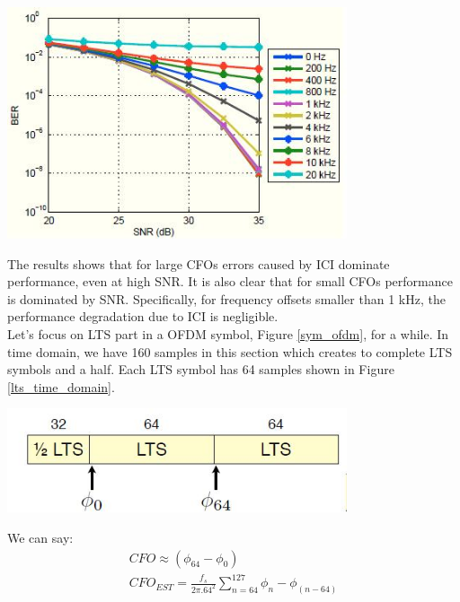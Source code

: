 \begin{center}
\includegraphics[width=10cm]{content/fig/cfo_on_ici.JPG}
\label{cfo_impact_on_ici}
\end{center}

The results shows that for large CFOs errors caused by ICI dominate performance, even at high SNR. It is also
clear that for small CFOs performance is dominated by SNR. Specifically, for frequency offsets smaller than 1 kHz, the
performance degradation due to ICI is negligible.\\
Let's focus on LTS part in a OFDM symbol, Figure \ref{sym_ofdm}, for a while. In time domain, we have 160 samples in this section which creates to complete LTS symbols and a half. Each LTS symbol has 64 samples shown in Figure \ref{lts_time_domain}.\\

\begin{center}
\includegraphics[width=10cm]{content/fig/LTS_time_domain.JPG}
\label{lts_time_domain}
\end{center}

We can say:
\begin{equation} \label{cfo_cal}
\begin{split}
CFO \approx (\phi_{64}- \phi_{0})\\
CFO_{EST} = \frac{f_{s}}{2\pi . 64^{2}} \sum\limits_{n=64}^{127} \phi_{n}- \phi_{(n-64)}\\
\end{split}
\end{equation}


